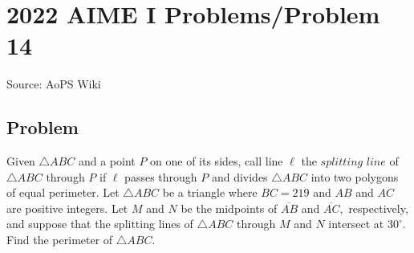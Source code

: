 \documentclass[12pt]{article}
\begin{document}
\section*{{2022 AIME I Problems/Problem 14}}
Source: AoPS Wiki

\subsection*{Problem}
Given $\triangle ABC$ and a point $P$ on one of its sides, call line $\ell$ the $\textit{splitting line}$ of $\triangle ABC$ through $P$ if $\ell$ passes through $P$ and divides $\triangle ABC$ into two polygons of equal perimeter. Let $\triangle ABC$ be a triangle where $BC = 219$ and $AB$ and $AC$ are positive integers. Let $M$ and $N$ be the midpoints of $\overline{AB}$ and $\overline{AC},$ respectively, and suppose that the splitting lines of $\triangle ABC$ through $M$ and $N$ intersect at $30^\circ.$ Find the perimeter of $\triangle ABC.$
\end{document}

